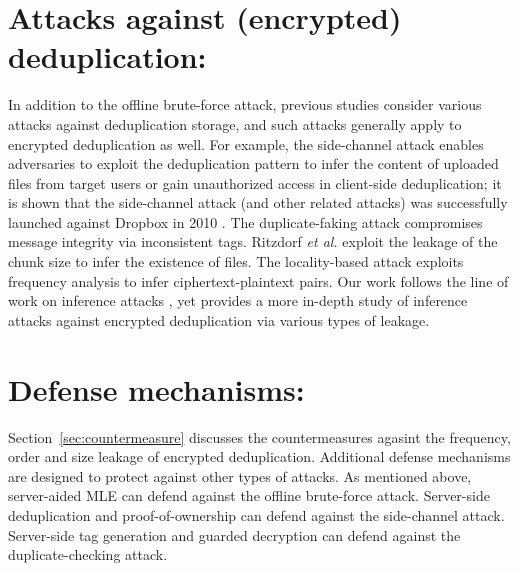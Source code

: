 
\section{Attacks against (encrypted) deduplication:} In addition to the
offline brute-force attack, previous studies consider various attacks against
deduplication storage, and such attacks generally apply to encrypted
deduplication as well.  For example, the side-channel attack
\cite{harnik10,halevi11} enables adversaries to exploit the deduplication
pattern to infer the content of uploaded files from target users or gain
unauthorized access in client-side deduplication; it is shown that the
side-channel attack (and other related attacks) was successfully launched
against Dropbox in 2010 \cite{mulazzani11}.  The duplicate-faking attack
\cite{bellare13a} compromises message integrity via inconsistent tags.
Ritzdorf {\em et al.} \cite{ritzdorf16} exploit the leakage of the chunk size
to infer the existence of files.  The locality-based attack \cite{li17}
exploits frequency analysis to infer ciphertext-plaintext pairs.  Our
work follows the line of work on inference attacks \cite{ritzdorf16,li17}, yet
provides a more in-depth study of inference attacks against encrypted
deduplication via various types of leakage. 
   
\section{Defense mechanisms:} 
Section~\ref{sec:countermeasure} discusses the countermeasures agasint the frequency, order and size leakage of encrypted deduplication. 
Additional defense mechanisms are designed to protect against other types of attacks.  
As mentioned above,
server-aided MLE \cite{bellare13b} can defend against the offline brute-force
attack. Server-side deduplication \cite{li15,harnik10,armknecht17} and
proof-of-ownership \cite{xu13,pietro12,halevi11} can defend against the
side-channel attack.  Server-side tag generation \cite{douceur02,bellare13b}
and guarded decryption \cite{bellare13a} can defend against the
duplicate-checking attack.  

